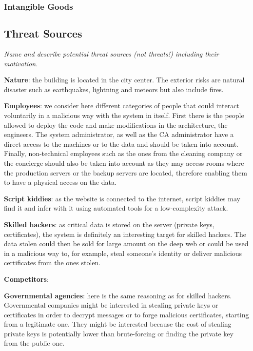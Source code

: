 \documentclass[english]{article}
\begin{document}
\subsubsection{Intangible Goods}


\subsection{Threat Sources}

\textit{Name and describe potential threat sources (\emph{not} threats!) including their motivation.}

\textbf{Nature}: the building is located in the city center. The exterior risks are natural disaster such as earthquakes, lightning and meteors but also include fires.

\textbf{Employees}: we consider here different categories of people that could interact voluntarily in a malicious way with the system in itself. First there is the people allowed to deploy the code and make modifications in the architecture, the engineers. The system administrator, as well as the CA administrator have a direct access to the machines or to the data and should be taken into account. Finally, non-technical employees such as the ones from the cleaning company or the concierge should also be taken into account as they may access rooms where the production servers or the backup servers are located, therefore enabling them to have a physical access on the data.

\textbf{Script kiddies}: as the website is connected to the internet, script kiddies may find it and infer with it using automated tools for a low-complexity attack.

\textbf{Skilled hackers}: as critical data is stored on the server (private keys, certificates), the system is definitely an interesting target for skilled hackers. The data stolen could then be sold for large amount on the deep web or could be used in a malicious way to, for example, steal someone's identity or deliver malicious certificates from the ones stolen.

\textbf{Competitors}: 

\textbf{Governmental agencies}: here is the same reasoning as for skilled hackers. Governmental companies might be interested in stealing private keys or certificates in order to decrypt messages or to forge malicious certificates, starting from a legitimate one. They might be interested because the cost of stealing private keys is potentially lower than brute-forcing or finding the private key from the public one.
\end{document}

